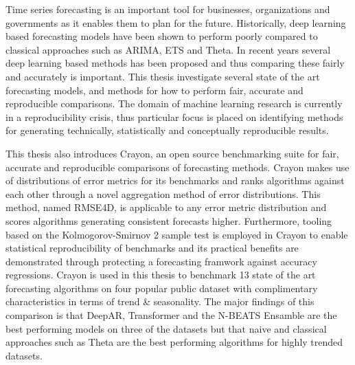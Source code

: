 Time series forecasting is an important tool for businesses, organizations and governments as it enables them to plan for the future. Historically, deep learning based forecasting models have been shown to perform poorly compared to classical approaches such as ARIMA, ETS and Theta. In recent years several deep learning based methods has been proposed and thus comparing these fairly and accurately is important. This thesis investigate several state of the art forecasting models, and methods for how to perform fair, accurate and reproducible comparisons. The domain of machine learning research is currently in a reproducibility crisis, thus particular focus is placed on identifying methods for generating technically, statistically and conceptually reproducible results.

This thesis also introduces Crayon, an open source benchmarking suite for fair, accurate and reproducible comparisons of forecasting methods. Crayon makes use of distributions of error metrics for its benchmarks and ranks algorithms against each other through a novel aggregation method of error distributions. This method, named RMSE4D, is applicable to any error metric distribution and scores algorithms generating consistent forecasts higher. Furthermore, tooling based on the Kolmogorov-Smirnov 2 sample test is employed in Crayon to enable statistical reproducibility of benchmarks and its practical benefits are demonstrated through protecting a forecasting framwork against accuracy regressions. Crayon is used in this thesis to benchmark 13 state of the art forecasting algorithms on four popular public dataset with complimentary characteristics in terms of trend \& seasonality. The major findings of this comparison is that DeepAR, Transformer and the N-BEATS Ensamble are the best performing models on three of the datasets but that naive and classical approaches such as Theta are the best performing algorithms for highly trended datasets.

